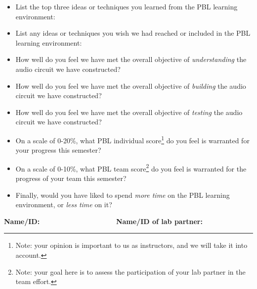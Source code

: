 \documentclass[10pt]{article}
\begin{document}
\begin{itemize}
\item List the top three ideas or techniques you learned from the PBL learning environment: \\ \vspace{0.5cm}
\item List any ideas or techniques you wish we had reached or included in the PBL learning environment: \\ \vspace{0.5cm}
\item How well do you feel we have met the overall objective of \textit{understanding} the audio circuit we have constructed? \\ \vspace{0.5cm}
\item How well do you feel we have met the overall objective of \textit{building} the audio circuit we have constructed? \\ \vspace{0.5cm}
\item How well do you feel we have met the overall objective of \textit{testing} the audio circuit we have constructed? \\ \vspace{0.5cm}
\item On a scale of 0-20\%, what PBL individual score\footnote{Note: your opinion is important to us as instructors, and we will take it into account.} do you feel is warranted for your progress this semester? \\ \vspace{0.25cm}
\item On a scale of 0-10\%, what PBL team score\footnote{Note: your goal here is to assess the participation of your lab partner in the team effort.} do you feel is warranted for the progress of your team this semester? \\ \vspace{0.25cm}
\item Finally, would you have liked to spend \textit{more time} on the PBL learning environment, or \textit{less time} on it?
\end{itemize} \vspace{1cm}
\textbf{Name/ID:}\underline{$~~~~~~~~~~~~~~~~~~~~~~~~~~~~~~~~~~~~~~~~~~~~~~~~~~$}\textbf{Name/ID of lab partner:}\underline{$~~~~~~~~~~~~~~~~~~~~~~~~~~~~~~~~~~~~~~~~~~~~~~~~~~$}
\end{document}
